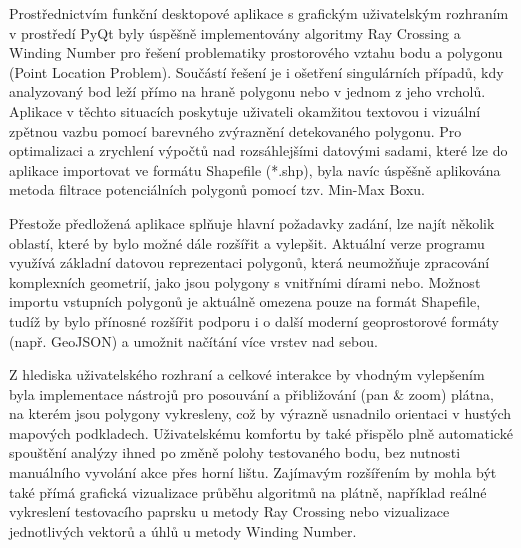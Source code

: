 \documentclass[12pt, a4paper]{article}
\begin{document}
Prostřednictvím funkční desktopové aplikace s grafickým uživatelským rozhraním v prostředí PyQt byly úspěšně implementovány algoritmy Ray Crossing a Winding Number pro řešení problematiky prostorového vztahu bodu a polygonu (Point Location Problem). Součástí řešení je i ošetření singulárních případů, kdy analyzovaný bod leží přímo na hraně polygonu nebo v jednom z jeho vrcholů. Aplikace v těchto situacích poskytuje uživateli okamžitou textovou i vizuální zpětnou vazbu pomocí barevného zvýraznění detekovaného polygonu. Pro optimalizaci a zrychlení výpočtů nad rozsáhlejšími datovými sadami, které lze do aplikace importovat ve formátu Shapefile (*.shp), byla navíc úspěšně aplikována metoda filtrace potenciálních polygonů pomocí tzv. Min-Max Boxu.

Přestože předložená aplikace splňuje hlavní požadavky zadání, lze najít několik oblastí, které by bylo možné dále rozšířit a vylepšit. Aktuální verze programu využívá základní datovou reprezentaci polygonů, která neumožňuje zpracování komplexních geometrií, jako jsou polygony s vnitřními dírami nebo. Možnost importu vstupních polygonů je aktuálně omezena pouze na formát Shapefile, tudíž by bylo přínosné rozšířit podporu i o další moderní geoprostorové formáty (např. GeoJSON) a umožnit načítání více vrstev nad sebou.

Z hlediska uživatelského rozhraní a celkové interakce by vhodným vylepšením byla implementace nástrojů pro posouvání a přibližování (pan \& zoom) plátna, na kterém jsou polygony vykresleny, což by výrazně usnadnilo orientaci v hustých mapových podkladech. Uživatelskému komfortu by také přispělo plně automatické spouštění analýzy ihned po změně polohy testovaného bodu, bez nutnosti manuálního vyvolání akce přes horní lištu. Zajímavým rozšířením by mohla být také přímá grafická vizualizace průběhu algoritmů na plátně, například reálné vykreslení testovacího paprsku u metody Ray Crossing nebo vizualizace jednotlivých vektorů a úhlů u metody Winding Number.

\printbibliography[title={Zdroje}]
\end{document}
